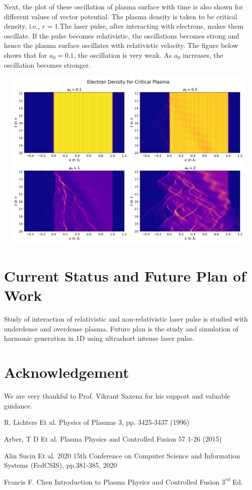 \documentclass[]{article}
\begin{document}
Next, the plot of these oscillation of plasma surface with time is also shown for different values of vector potential. The plasma density is taken to be critical density, i.e., $r=1$.The laser pulse, after interacting with electrons, makes them oscillate. If the pulse becomes relativistic, the oscillations becomes strong and hence the plasma surface oscillates with relativistic velocity.
The figure below shows that for $a_0=0.1$, the oscillation is very weak. As $a_0$ increases, the oscillation becomes stronger.
\noindent
\begin{center}
    \includegraphics[height=9cm, width=16cm]{density.png}

\end{center}
\section{Current Status and Future Plan of Work}
Study of interaction of relativistic and non-relativistic laser pulse is studied with underdense and overdense plasma. Future plan is the study and simulation of harmonic generation in 1D using ultrashort intense laser pulse.
\section{Acknowledgement}
We are very thankful to Prof. Vikrant Saxena for his support and valuable guidance.
\begin{thebibliography}{9}
    R. Lichters Et al. Physics of Plasmas 3, pp. 3425-3437 (1996)

    Arber, T D Et al. Plasma Physics and Controlled Fusion 57 1-26 (2015)

    Alin Suciu Et al. 2020 15th Conference on Computer Science and Information Systems (FedCSIS), pp.381-385, 2020

    Francis F. Chen
    Introduction to Plasma Physics and Controlled Fusion $3^{rd}$ Ed.

\end{thebibliography}

\end{document}
